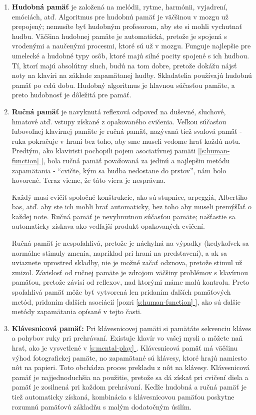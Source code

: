 \documentclass[11pt,a4paper]{book}
\newcommand*{\fullref}[1]{\hyperref[{#1}]{\ref*{#1} \nameref*{#1}}} %
\newcommand*{\fullrefp}[1]{[\fullref{#1}]} %
\begin{document}
\begin{enumerate}[(1)]
\item \textbf{Hudobná pamäť} je založená na melódii, rytme, harmónii, vyjadrení, emóciách, atď. Algoritmus pre hudobnú pamäť je väčšinou v mozgu  už prepojený; nemusíte byť hudobným profesorom, aby ste si mohli vychutnať hudbu. Väčšina hudobnej pamäte je automatická, pretože je spojená s vrodenými a naučenými procesmi, ktoré sú už v mozgu. Funguje najlepšie pre umelecké a hudobné typy osôb, ktoré majú silné pocity spojené s ich hudbou. Tí, ktorí majú absolútny sluch, budú na tom dobre, pretože dokážu nájsť noty na klavíri na základe zapamätanej hudby. Skladatelia používajú hudobnú pamäť po celú dobu. Hudobný algoritmus je hlavnou súčasťou pamäte, a preto hudobnosť je dôležitá pre pamäť.

\item \textbf{Ručná pamäť} je navyknutá reflexová odpoveď na duševné, sluchové, hmatové atď. vstupy získané z opakovaného cvičenia. Veľkou súčasťou ľubovoľnej klavírnej pamäte je ručná pamäť, nazývaná tiež svalová pamäť - ruka pokračuje v hraní bez toho, aby sme museli vedome hrať každú notu. Predtým, ako klaviristi pochopili pojem asociatívnej pamäti \fullrefp{s:human-function}, bola ručná pamäť považovaná za jedinú a najlepšiu metódu zapamätania - “cvičte, kým sa hudba nedostane do prstov”, nám bolo hovorené. Teraz vieme, že táto viera je nesprávna.

Každý musí cvičiť spoločné konštrukcie, ako sú stupnice, arpeggiá, Albertiho bas, atď. aby ste ich mohli hrať automaticky, bez toho aby museli premýšľať o každej note. Ručná pamäť je nevyhnutnou súčasťou pamäte; našťastie sa automaticky získava ako vedľajší produkt opakovaných cvičení.

Ručná pamäť je nespoľahlivá, pretože je náchylná na výpadky (kedykoľvek sa normálne stimuly zmenia, napríklad pri hraní na predstavení), a ak sa uviaznete uprostred skladby, nie je možné začať odznova, pretože stimul už zmizol. Závislosť od ručnej pamäte je zdrojom väčšiny problémov s klavírnou pamäťou, pretože závisí od reflexov, nad ktorými máme malú kontrolu. Preto spoľahlivá pamäť môže byť vytvorená len pridaním ďalších pamäťových metód, pridaním ďalších asociácií {[}pozri \fullref{s:human-function}{]}, ako sú ďalšie metódy zapamätania opísané v tejto časti.

\item \textbf{Klávesnicová pamäť:} Pri klávesnicovej pamäti si pamätáte sekvenciu kláves a pohybov ruky pri prehrávaní. Existuje klavír vo vašej mysli a môžete naň hrať, ako je vysvetlené v \fullref{s:mental-play}. Klávesnicová pamäť má väčšinu výhod fotografickej pamäte, no zapamätané sú klávesy, ktoré hrajú namiesto nôt na papieri. Toto obchádza proces prekladu z nôt na klávesy. Klávesnicová pamäť je najjednoduchšia na použitie, pretože sa dá získať pri cvičení diela a pamäť je zosilnená pri každom prehrávaní. Keďže hudobná a ručná pamäť je tiež automaticky získaná, kombinácia s klávesnicovou pamäťou poskytne rozumnú pamäťovú základňu s malým dodatočným úsilím.


\end{enumerate}
\end{document}
